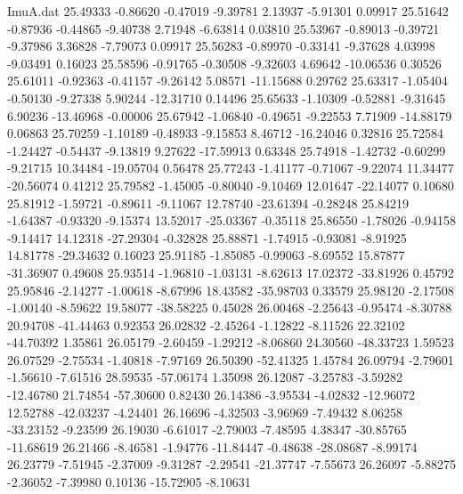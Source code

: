 \begin{filecontents}{ImuA.dat}
  25.49333   -0.86620   -0.47019   -9.39781    2.13937   -5.91301    0.09917
  25.51642   -0.87936   -0.44865   -9.40738    2.71948   -6.63814    0.03810
  25.53967   -0.89013   -0.39721   -9.37986    3.36828   -7.79073    0.09917
  25.56283   -0.89970   -0.33141   -9.37628    4.03998   -9.03491    0.16023
  25.58596   -0.91765   -0.30508   -9.32603    4.69642  -10.06536    0.30526
  25.61011   -0.92363   -0.41157   -9.26142    5.08571  -11.15688    0.29762
  25.63317   -1.05404   -0.50130   -9.27338    5.90244  -12.31710    0.14496
  25.65633   -1.10309   -0.52881   -9.31645    6.90236  -13.46968   -0.00006
  25.67942   -1.06840   -0.49651   -9.22553    7.71909  -14.88179    0.06863
  25.70259   -1.10189   -0.48933   -9.15853    8.46712  -16.24046    0.32816
  25.72584   -1.24427   -0.54437   -9.13819    9.27622  -17.59913    0.63348
  25.74918   -1.42732   -0.60299   -9.21715   10.34484  -19.05704    0.56478
  25.77243   -1.41177   -0.71067   -9.22074   11.34477  -20.56074    0.41212
  25.79582   -1.45005   -0.80040   -9.10469   12.01647  -22.14077    0.10680
  25.81912   -1.59721   -0.89611   -9.11067   12.78740  -23.61394   -0.28248
  25.84219   -1.64387   -0.93320   -9.15374   13.52017  -25.03367   -0.35118
  25.86550   -1.78026   -0.94158   -9.14417   14.12318  -27.29304   -0.32828
  25.88871   -1.74915   -0.93081   -8.91925   14.81778  -29.34632    0.16023
  25.91185   -1.85085   -0.99063   -8.69552   15.87877  -31.36907    0.49608
  25.93514   -1.96810   -1.03131   -8.62613   17.02372  -33.81926    0.45792
  25.95846   -2.14277   -1.00618   -8.67996   18.43582  -35.98703    0.33579
  25.98120   -2.17508   -1.00140   -8.59622   19.58077  -38.58225    0.45028
  26.00468   -2.25643   -0.95474   -8.30788   20.94708  -41.44463    0.92353
  26.02832   -2.45264   -1.12822   -8.11526   22.32102  -44.70392    1.35861
  26.05179   -2.60459   -1.29212   -8.06860   24.30560  -48.33723    1.59523
  26.07529   -2.75534   -1.40818   -7.97169   26.50390  -52.41325    1.45784
  26.09794   -2.79601   -1.56610   -7.61516   28.59535  -57.06174    1.35098
  26.12087   -3.25783   -3.59282  -12.46780   21.74854  -57.30600    0.82430
  26.14386   -3.95534   -4.02832  -12.96072   12.52788  -42.03237   -4.24401
  26.16696   -4.32503   -3.96969   -7.49432    8.06258  -33.23152   -9.23599
  26.19030   -6.61017   -2.79003   -7.48595    4.38347  -30.85765  -11.68619
  26.21466   -8.46581   -1.94776  -11.84447   -0.48638  -28.08687   -8.99174
  26.23779   -7.51945   -2.37009   -9.31287   -2.29541  -21.37747   -7.55673
  26.26097   -5.88275   -2.36052   -7.39980    0.10136  -15.72905   -8.10631

\end{filecontents}
